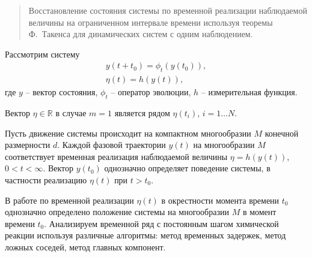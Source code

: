 \begin{abstract}
Восстановление состояния системы по временной реализации наблюдаемой величины на ограниченном интервале времени используя теоремы Ф.~Такенса для динамических систем с одним наблюдением.

\end{abstract}


Рассмотрим систему
$$
\begin{array}{l}
y(t+t_0)=\phi_t(y(t_0)),\\
\eta(t)=h(y(t)),
\end{array}
$$
где $y$ -- вектор состояния, $\phi_t$ -- оператор эволюции, $h$ -- измерительная функция.


 Вектор $\eta\in\mathbb{R}$ в случае $m=1$ является рядом $\eta(t_i)$, $i=1\ldots N$.
	

Пусть движение системы происходит на компактном многообразии $M$ конечной размерности $d$. Каждой фазовой траектории $y(t)$ на многообразии $M$ соответствует временная реализация наблюдаемой величины $\eta=h(y(t))$, $0<t<\infty$. Вектор $y(t_0)$ однозначно определяет поведение системы, в частности реализацию $\eta(t)$ при $t>t_0$. 

В работе по временной реализации $\eta(t)$  в окрестности момента времени $t_0$ однозначно определено положение системы на многообразии $M$ в момент времени $t_0$. Анализируем временной ряд с постоянным шагом химической реакции используя различные алгоритмы: метод временных задержек, метод ложных соседей, метод главных компонент.


%

%

